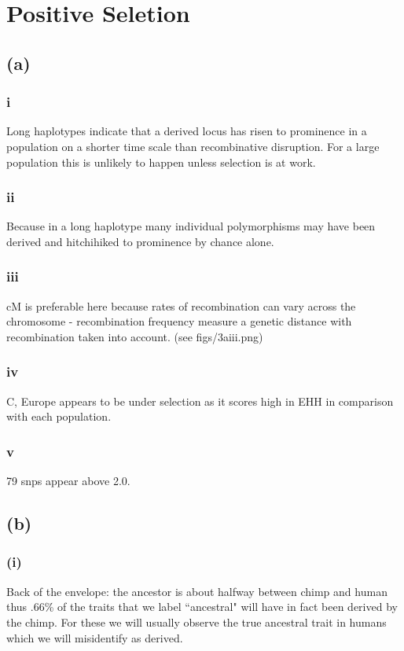 \documentclass[12pt,draft,a4paper]{article}
\begin{document}
\section{Positive Seletion}
\subsection*{(a)}
\subsubsection*{i}
Long haplotypes indicate that a derived locus has risen to  prominence in a population on a shorter time scale than recombinative disruption. For a large population this is unlikely to happen unless selection is at work.
\subsubsection*{ii}
Because in a long haplotype many individual polymorphisms may have been derived and hitchihiked to prominence by chance alone.
\subsubsection*{iii}
cM is preferable here because rates of recombination can vary across the chromosome - recombination frequency measure a genetic distance with recombination taken into account. (see figs/3aiii.png)
\subsubsection*{iv}
C, Europe appears to be under selection as it scores high in EHH in comparison with each population.
\subsubsection*{v}
79 snps appear above 2.0.
\subsection*{(b)}
\subsubsection*{(i)}
Back of the envelope: the ancestor is about halfway between chimp and human thus $.66$\% of the traits that we label ``ancestral" will have in fact been derived by the chimp. For these we will usually observe the true ancestral trait in humans which we will misidentify as derived. 
\end{document}
